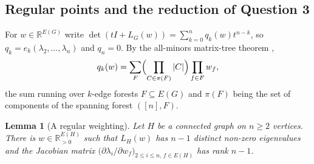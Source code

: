 \documentclass[11pt]{amsart}
\newtheorem{lemma}[theorem]{Lemma}
\theoremstyle{definition}
\theoremstyle{remark}
\providecommand{\R}{\mathbb R}
\begin{document}
\subsection{Regular points and the reduction of Question 3}
\label{R4:subsec:reduction}

For $w\in\R^{E(G)}$ write
$\det(tI+L_G(w))=\sum_{k=0}^{n}q_k(w)t^{n-k}$, so
$q_k=e_k(\lambda_2,\dots,\lambda_n)$ and $q_n=0$.  By the all-minors
matrix-tree theorem \cite{R4-Chaiken},
\begin{equation}\label{R4:eq:forest}
 q_k(w)=\sum_{F}\Bigl(\prod_{C\in\pi(F)}|C|\Bigr)\prod_{f\in F}w_f ,
\end{equation}
the sum running over $k$-edge forests $F\subseteq E(G)$ and $\pi(F)$ being
the set of components of the spanning forest $([n],F)$.

\begin{lemma}[A regular weighting]\label{R4:lem:regular}
Let $H$ be a connected graph on $n\ge2$ vertices.  There is
$w\in\R_{>0}^{E(H)}$ such that $L_H(w)$ has $n-1$ distinct non-zero
eigenvalues and the Jacobian matrix
$\bigl(\partial\lambda_i/\partial w_f\bigr)_{2\le i\le n,\,f\in E(H)}$ has
rank $n-1$.
\end{lemma}
\end{document}
